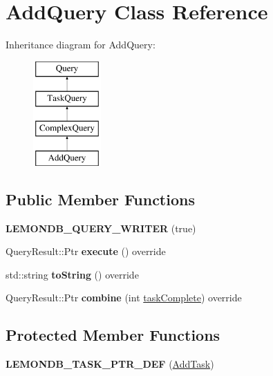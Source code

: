\hypertarget{class_add_query}{}\section{Add\+Query Class Reference}
\label{class_add_query}
Inheritance diagram for Add\+Query\+:\begin{figure}[H]
\begin{center}
\leavevmode
\includegraphics[height=4.000000cm]{class_add_query}
\end{center}
\end{figure}
\subsection*{Public Member Functions}
\begin{DoxyCompactItemize}
\item 
\mbox{\label{class_add_query_a6d70d7095946011b69267a16b3cc2f8f}} 
{\bfseries L\+E\+M\+O\+N\+D\+B\+\_\+\+Q\+U\+E\+R\+Y\+\_\+\+W\+R\+I\+T\+ER} (true)
\item 
\mbox{\label{class_add_query_acc064c75c7141c013b2ba6dcc0effe97}} 
Query\+Result\+::\+Ptr {\bfseries execute} () override
\item 
\mbox{\label{class_add_query_aad3f5ecd3708f5929e0d4ce44bf6d384}} 
std\+::string {\bfseries to\+String} () override
\item 
\mbox{\label{class_add_query_aff12e07565e439e191f71bd2caa9f7a9}} 
Query\+Result\+::\+Ptr {\bfseries combine} (int \hyperlink{class_task_query_a3dc3e4c56ddea8ff025239fd9da358d3}{task\+Complete}) override
\end{DoxyCompactItemize}
\subsection*{Protected Member Functions}
\begin{DoxyCompactItemize}
\item 
\mbox{\label{class_add_query_adaf7f0b6b7c853e217941816d3db7164}} 
{\bfseries L\+E\+M\+O\+N\+D\+B\+\_\+\+T\+A\+S\+K\+\_\+\+P\+T\+R\+\_\+\+D\+EF} (\hyperlink{class_add_task}{Add\+Task})
\end{DoxyCompactItemize}
